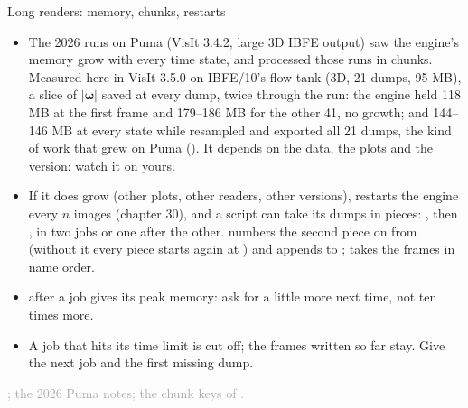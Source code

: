 \documentclass[aspectratio=169,11pt]{beamer}
\newcommand{\sourcecredit}[1]{\vfill\begin{flushright}\tiny\textcolor{DarkGray}{#1}\end{flushright}}
\begin{document}
\begin{frame}{Long renders: memory, chunks, restarts}
\label{fr:memory}
\footnotesize
\begin{itemize}\setlength{\itemsep}{1pt}
  \item The 2026 runs on Puma (VisIt 3.4.2, large 3D IBFE output) saw the engine's memory grow with every time state, and processed those runs in chunks. Measured here in VisIt 3.5.0 on IBFE/10's flow tank (3D, 21 dumps, 95 MB), a slice of $|\boldsymbol{\omega}|$ saved at every dump, twice through the run: the engine held 118 MB at the first frame and 179--186 MB for the other 41, no growth; and 144--146 MB at every state while  resampled and exported all 21 dumps, the kind of work that grew on Puma (). It depends on the data, the plots and the version: watch it on yours.
  \item If it does grow (other plots, other readers, other versions),  restarts the engine every $n$ images (chapter 30), and a script can take its dumps in pieces: , then , in two jobs or one after the other.  numbers the second piece on from  (without it every piece starts again at ) and appends to ;  takes the frames in name order.
  \item {} after a job gives its peak memory: ask for a little more next time, not ten times more.
  \item A job that hits its time limit is cut off; the frames written so far stay. Give the next job  and  the first missing dump.
\end{itemize}
\sourcecredit{; the 2026 Puma notes; the chunk keys of \code{visit\_movie\_frames.py}.}
\end{frame}
\end{document}
